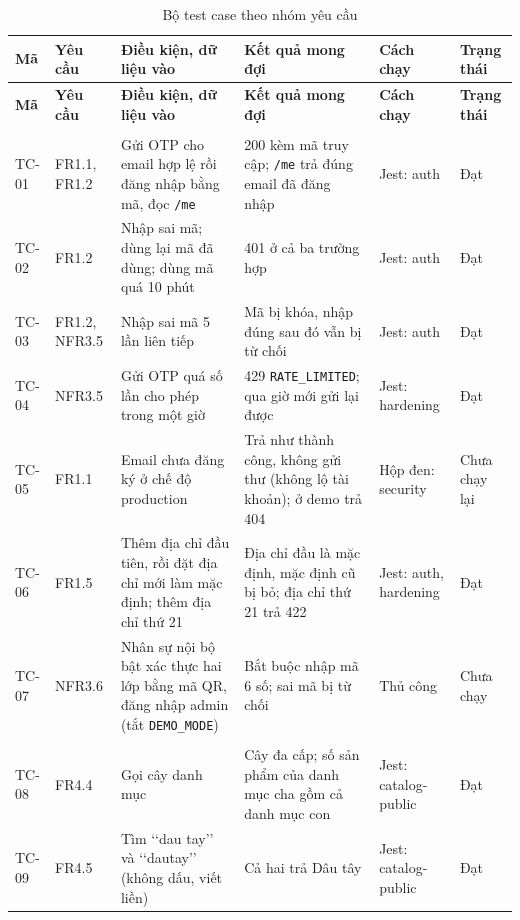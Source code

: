 \begingroup
\tblsetup\tblzebra
\begin{longtable}{L{1.40cm} L{1.55cm} L{4.00cm} L{4.05cm} L{1.95cm} L{1.95cm}}
\caption{Bộ test case theo nhóm yêu cầu}
\label{tab:testcase} \\
\toprule
{}
\textbf{Mã} & \textbf{Yêu cầu} & \textbf{Điều kiện, dữ liệu vào} & \textbf{Kết quả mong đợi} & \textbf{Cách chạy} & \textbf{Trạng thái} \\
\midrule
\endfirsthead
\toprule
{}
\textbf{Mã} & \textbf{Yêu cầu} & \textbf{Điều kiện, dữ liệu vào} & \textbf{Kết quả mong đợi} & \textbf{Cách chạy} & \textbf{Trạng thái} \\
\midrule
\endhead
\bottomrule
\endfoot
{}
 \\
TC-01 & FR1.1, FR1.2 & Gửi OTP cho email hợp lệ rồi đăng nhập bằng mã, đọc \texttt{/me} & 200 kèm mã truy cập; \texttt{/me} trả đúng email đã đăng nhập & Jest: auth & Đạt \\
TC-02 & FR1.2 & Nhập sai mã; dùng lại mã đã dùng; dùng mã quá 10 phút & 401 ở cả ba trường hợp & Jest: auth & Đạt \\
TC-03 & FR1.2, NFR3.5 & Nhập sai mã 5 lần liên tiếp & Mã bị khóa, nhập đúng sau đó vẫn bị từ chối & Jest: auth & Đạt \\
TC-04 & NFR3.5 & Gửi OTP quá số lần cho phép trong một giờ & 429 \texttt{RATE\_LIMITED}; qua giờ mới gửi lại được & Jest: hardening & Đạt \\
TC-05 & FR1.1 & Email chưa đăng ký ở chế độ production & Trả như thành công, không gửi thư (không lộ tài khoản); ở demo trả 404 & Hộp đen: security & Chưa chạy lại \\
TC-06 & FR1.5 & Thêm địa chỉ đầu tiên, rồi đặt địa chỉ mới làm mặc định; thêm địa chỉ thứ 21 & Địa chỉ đầu là mặc định, mặc định cũ bị bỏ; địa chỉ thứ 21 trả 422 & Jest: auth, hardening & Đạt \\
TC-07 & NFR3.6 & Nhân sự nội bộ bật xác thực hai lớp bằng mã QR, đăng nhập admin (tắt \texttt{DEMO\_MODE}) & Bắt buộc nhập mã 6 số; sai mã bị từ chối & Thủ công & Chưa chạy \\
 \\
TC-08 & FR4.4 & Gọi cây danh mục & Cây đa cấp; số sản phẩm của danh mục cha gồm cả danh mục con & Jest: catalog-public & Đạt \\
TC-09 & FR4.5 & Tìm \lq\lq dau tay\rq\rq{} và \lq\lq dautay\rq\rq{} (không dấu, viết liền) & Cả hai trả Dâu tây & Jest: catalog-public & Đạt \\

\end{longtable}
